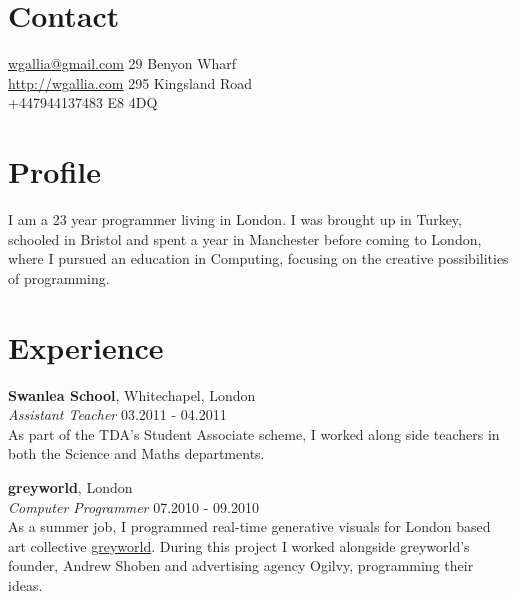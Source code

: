 \documentclass[margin,line,a4paper]{resume}
\begin{document}

\begin{resume}

\section{\mysidestyle Contact}

\hypersetup{urlcolor=Fuchsia}
\href{mailto:wgallia@gmail.com}{wgallia@gmail.com}	\hfill 	29 Benyon Wharf   \\
\hypersetup{urlcolor=RoyalBlue}
\href{http://wgallia.com}{http://wgallia.com}		\hfill  295 Kingsland Road \\
+447944137483										\hfill	E8 4DQ \\

\section{\mysidestyle Profile}

I am a 23 year programmer living in London. I was brought up in Turkey, schooled in Bristol and spent a year in Manchester before coming to London, where I pursued an education in Computing, focusing on the creative possibilities of programming.

\section{\mysidestyle Experience}
\textbf{Swanlea School}, Whitechapel, London \vspace{1mm}\\
\textsl{Assistant Teacher} \hfill 03.2011 - 04.2011 \vspace{2mm} \\
As part of the TDA’s Student Associate scheme, I worked along side teachers in both the Science and Maths departments.

\textbf{greyworld}, London  \vspace{1mm}\\
\textsl{Computer Programmer} \hfill 07.2010 - 09.2010 \vspace{2mm} \\
As a summer job, I programmed real-time generative visuals for London based art collective \href{http://greyworld.org}{greyworld}. During this project I worked alongside greyworld's founder, Andrew Shoben and advertising agency Ogilvy, programming their ideas.


\end{resume}
\end{document}
